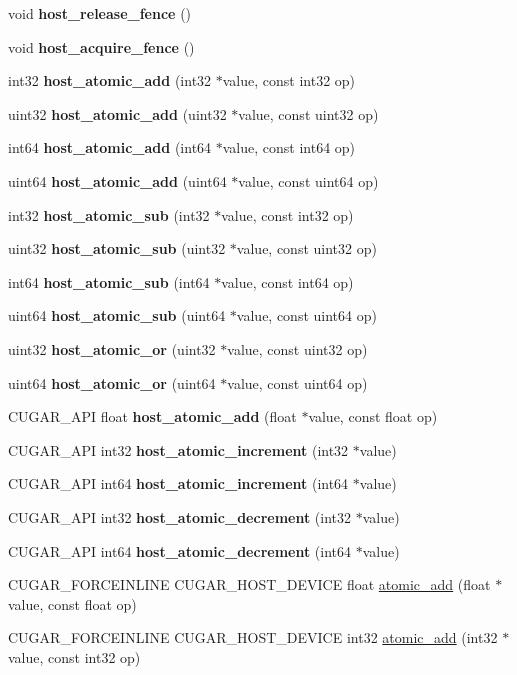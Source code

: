 \begin{DoxyCompactItemize}
\item 
void {\bfseries host\+\_\+release\+\_\+fence} ()
\item 
void {\bfseries host\+\_\+acquire\+\_\+fence} ()
\item 
int32 {\bfseries host\+\_\+atomic\+\_\+add} (int32 $\ast$value, const int32 op)
\item 
uint32 {\bfseries host\+\_\+atomic\+\_\+add} (uint32 $\ast$value, const uint32 op)
\item 
int64 {\bfseries host\+\_\+atomic\+\_\+add} (int64 $\ast$value, const int64 op)
\item 
uint64 {\bfseries host\+\_\+atomic\+\_\+add} (uint64 $\ast$value, const uint64 op)
\item 
int32 {\bfseries host\+\_\+atomic\+\_\+sub} (int32 $\ast$value, const int32 op)
\item 
uint32 {\bfseries host\+\_\+atomic\+\_\+sub} (uint32 $\ast$value, const uint32 op)
\item 
int64 {\bfseries host\+\_\+atomic\+\_\+sub} (int64 $\ast$value, const int64 op)
\item 
uint64 {\bfseries host\+\_\+atomic\+\_\+sub} (uint64 $\ast$value, const uint64 op)
\item 
uint32 {\bfseries host\+\_\+atomic\+\_\+or} (uint32 $\ast$value, const uint32 op)
\item 
uint64 {\bfseries host\+\_\+atomic\+\_\+or} (uint64 $\ast$value, const uint64 op)
\item 
C\+U\+G\+A\+R\+\_\+\+A\+PI float {\bfseries host\+\_\+atomic\+\_\+add} (float $\ast$value, const float op)
\item 
C\+U\+G\+A\+R\+\_\+\+A\+PI int32 {\bfseries host\+\_\+atomic\+\_\+increment} (int32 $\ast$value)
\item 
C\+U\+G\+A\+R\+\_\+\+A\+PI int64 {\bfseries host\+\_\+atomic\+\_\+increment} (int64 $\ast$value)
\item 
C\+U\+G\+A\+R\+\_\+\+A\+PI int32 {\bfseries host\+\_\+atomic\+\_\+decrement} (int32 $\ast$value)
\item 
C\+U\+G\+A\+R\+\_\+\+A\+PI int64 {\bfseries host\+\_\+atomic\+\_\+decrement} (int64 $\ast$value)
\item 
C\+U\+G\+A\+R\+\_\+\+F\+O\+R\+C\+E\+I\+N\+L\+I\+NE C\+U\+G\+A\+R\+\_\+\+H\+O\+S\+T\+\_\+\+D\+E\+V\+I\+CE float \hyperlink{group___atomics_ga0c9d949be7ac5b6f27a232c7cd27a05c}{atomic\+\_\+add} (float $\ast$value, const float op)
\item 
C\+U\+G\+A\+R\+\_\+\+F\+O\+R\+C\+E\+I\+N\+L\+I\+NE C\+U\+G\+A\+R\+\_\+\+H\+O\+S\+T\+\_\+\+D\+E\+V\+I\+CE int32 \hyperlink{group___atomics_ga584797bd163a76c90bf0fb5c7df58de4}{atomic\+\_\+add} (int32 $\ast$value, const int32 op)

\end{DoxyCompactItemize}
